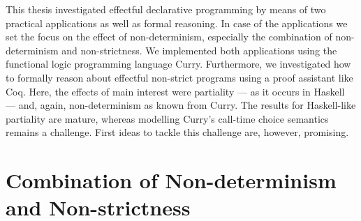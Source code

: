 %

This thesis investigated effectful declarative programming by means of two practical applications as well as formal reasoning.
In case of the applications we set the focus on the effect of non\--determinism, especially the combination of non\--determinism and non\--strictness.
We implemented both applications using the functional logic programming language Curry.
Furthermore, we investigated how to formally reason about effectful non\--strict programs using a proof assistant like Coq.
Here, the effects of main interest were partiality --- as it occurs in Haskell --- and, again, non\--determinism as known from Curry.
The results for Haskell\--like partiality are mature, whereas modelling Curry's call\--time choice semantics remains a challenge.
First ideas to tackle this challenge are, however, promising.

\section{Combination of Non\--determinism and Non\--strictness}

